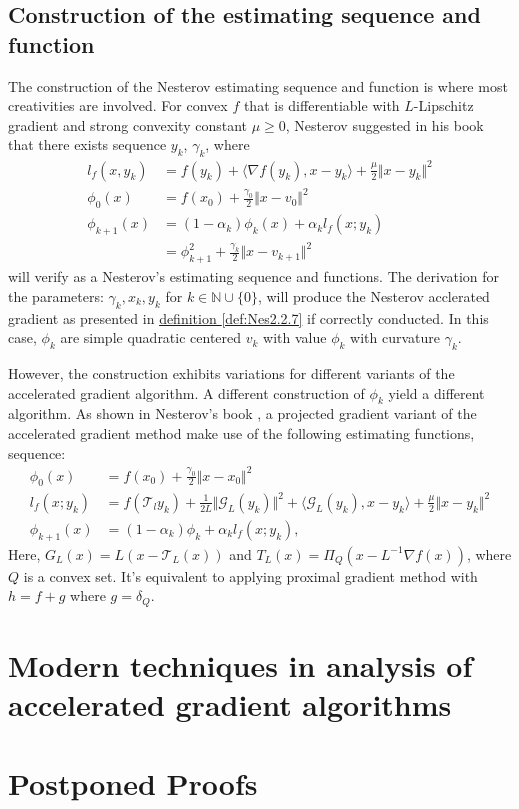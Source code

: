 \documentclass[12pt]{article}
\begin{document}
    \subsection{Construction of the estimating sequence and function}
        The construction of the Nesterov estimating sequence and function is where most creativities are involved. 
        For convex $f$ that is differentiable with $L$-Lipschitz gradient and strong convexity constant $\mu \ge 0$, Nesterov suggested in his book \cite{nesterov_lectures_2018} that there exists sequence $y_k$, $\gamma_k$, where
        \begin{align*}
            l_f(x, y_k) &= 
            f(y_k) + \langle \nabla f(y_k), x - y_k\rangle + 
            \frac{\mu}{2}\Vert x - y_k\Vert^2
            \\
            \phi_0 (x) &= 
            f(x_0) + \frac{\gamma_0}{2}\Vert x - v_0\Vert^2
            \\
            \phi_{k + 1}(x) &= 
            (1 - \alpha_k)\phi_k(x) + \alpha_k l_f(x; y_k)
            \\
            &= \phi_{k + 1}^2 + \frac{\gamma_k}{2}\Vert x - v_{k + 1}\Vert^2
        \end{align*}
        will verify as a Nesterov's estimating sequence and functions. 
        The derivation for the parameters: $\gamma_k, x_k, y_k$ for $k \in \mathbb N \cup \{0\}$, will produce the Nesterov acclerated gradient as presented in
        \hyperref[def:Nes2.2.7]{definition \ref*{def:Nes2.2.7}}
        if correctly conducted. 
        In this case, $\phi_k$ are simple quadratic centered $v_k$ with value $\phi_k$ with curvature $\gamma_k$. 
        \par
        However, the construction exhibits variations for different variants of the accelerated gradient algorithm. 
        A different construction of $\phi_k$ yield a different algorithm. 
        As shown in Nesterov's book \cite*[(2.2.63)]{nesterov_lectures_2018}, a projected gradient variant of the accelerated gradient method make use of the following estimating functions, sequence: 
        \begin{align*}
            \phi_0 (x) &= f(x_0) + \frac{\gamma_0}{2}\Vert x - x_0\Vert^2
            \\
            l_f(x; y_k) &= f(\mathcal T_ly_k) + 
            \frac{1}{2L}\Vert \mathcal G_L(y_k)\Vert^2 + 
            \langle \mathcal G_L(y_k), x - y_k\rangle + 
            \frac{\mu}{2}\Vert x - y_k\Vert^2
            \\
            \phi_{k + 1}(x) &= 
            (1 - \alpha_k)\phi_k + 
            \alpha_k l_f(x; y_k), 
        \end{align*}
        Here, $G_L(x) = L(x - \mathcal T_L(x))$ and $T_L(x) = \Pi_Q(x - L^{-1}\nabla f(x))$, where $Q$ is a convex set. 
        It's equivalent to applying proximal gradient method with $h = f + g$ where $g = \delta_Q$. 

        
        
        

\section{Modern techniques in analysis of accelerated gradient algorithms}
    

\printbibliography

\appendix
\section*{Postponed Proofs}
    
\end{document}
